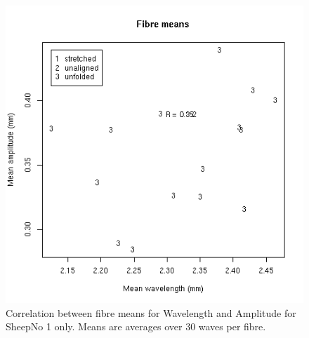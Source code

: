 %

\begin{figure}[!h]
  \centering
  \includegraphics[width=1.0\textwidth]{figsffibremeanssheep1.png}
  \caption{Correlation between fibre means for Wavelength and Amplitude for SheepNo 1 only. Means are averages over 30 waves per fibre.}
  \label{fig:sffibremeanssheep1}
\end{figure}

%

